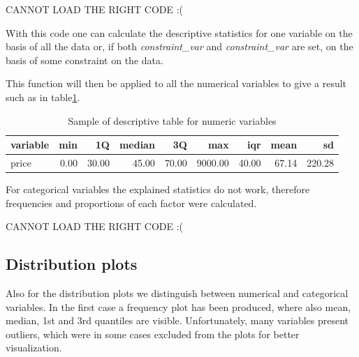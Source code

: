 CANNOT LOAD THE RIGHT CODE :(


With this code one can calculate the descriptive statistics for one variable on the basis of all the data or, if both \textit{constraint\_var} and \textit{constraint\_var} are set, on the basis of some constraint on the data.

This function will then be applied to all the numerical variables to give a result such as in table\ref{table:sumstatnum}.

\begin{table}[H]
\centering
\begin{tabular}{lrrrrrrrr}
  \hline \hline
variable & min & 1Q & median & 3Q & max & iqr & mean & sd \\ 
  \hline
price & 0.00 & 30.00 & 45.00 & 70.00 & 9000.00 & 40.00 & 67.14 & 220.28 \\ 
   \hline \hline
\end{tabular}
\caption{Sample of descriptive table for numeric variables}
\label{table:sumstatnum}
\end{table}

For categorical variables the explained statistics do not work, therefore frequencies and proportions of each factor were calculated.

CANNOT LOAD THE RIGHT CODE :(



\subsection{Distribution plots}\label{subsec:distrplots}

Also for the distribution plots we distinguish between numerical and categorical variables. In the first case a frequency plot has been produced, where also mean, median, 1st and 3rd quantiles are visible.
Unfortunately, many variables present outliers, which were in some cases excluded from the plots for better visualization.

